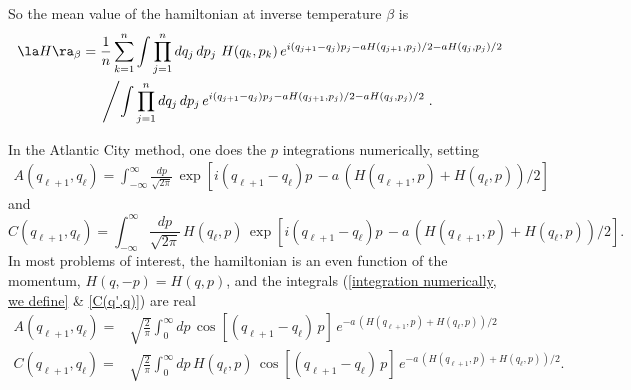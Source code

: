 \documentclass[prd,preprint,floatfix,showpacs]{revtex4-1}
\begin{document}
So the mean value of the hamiltonian 
at inverse temperature \( \beta \) is
\begin{equation}
   \begin{split}
\la H \ra_\beta ={}& 
\frac{1}{n} \sum_{k=1}^n 
\int \prod_{j=1}^n dq_j \, dp_j \,
\, H(q_k,p_k) 
\, e^{ i (q_{j+1} - q_j) p_j  - a H(q_{j+1},p_j)/2
 - a H(q_j,p_j)/2 }
\\
{}& \left/ \int \prod_{j=1}^n  
dq_j \, dp_j \,
e^{ i (q_{j+1} - q_j) p_j  - a H(q_{j+1},p_j)/2
 - a H(q_j,p_j)/2 } \right. .
 \label {maybe big eq for E0}
   \end{split}
\end{equation}
\par
In the Atlantic City method,
one does the \( p \) integrations numerically, setting
\begin{equation}
\begin{split}
A(q_{\ell+1}, q_\ell) 
= \int_{-\infty}^\infty \frac{dp}{\sqrt{2\pi}} \,
\exp \left[i (q_{\ell+1} - q_\ell) p \, 
- a \, \left( H(q_{\ell+1}, p) + H(q_\ell, p) \right)/2\right] 
\label {integration numerically, we define}
\end{split}
\end{equation}
and
\begin{equation}
C(q_{\ell+1},q_\ell) = {}  \int_{-\infty}^\infty 
\frac{dp}{\sqrt{2\pi}} \,
H(q_\ell, p) \,
\exp \left[i (q_{\ell+1} - q_\ell) p \, 
- a \, \left( H(q_{\ell+1}, p) + H(q_\ell, p) \right)/2 \right] .
\label {C(q',q)}
\end{equation}
In most problems of interest,
the hamiltonian is an even function
of the momentum, \( H(q,-p) = H(q,p) \),
and the integrals 
(\ref {integration numerically, we define} \&
\ref {C(q',q)}) are real
\begin{equation}
\begin{split}
A(q_{\ell+1}, q_\ell) = {} & \sqrt{\frac{2}{\pi}}
\int_0^\infty dp \,
\cos \left[(q_{\ell+1} - q_\ell) \, p \right] \,
e^{- a \, \left( H(q_{\ell+1}, p) + H(q_\ell, p) \right)/2 } 
\\
C(q_{\ell+1}, q_\ell) = {} & \sqrt{\frac{2}{\pi}}
\int_0^\infty dp \, H(q_\ell, p) \,
\cos \left[ (q_{\ell+1} - q_\ell) \, p \right] \,
e^{- a \, \left( H(q_{\ell+1}, p) + H(q_\ell, p) \right)/2 }  .
\label {and the integrals are real}
\end{split}
\end{equation}
\end{document}
